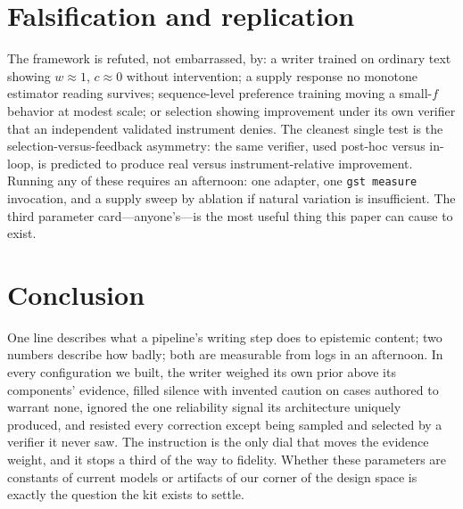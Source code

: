 \documentclass[11pt]{article}
\newcommand{\ww}{\ensuremath{w}}
\newcommand{\cc}{\ensuremath{c}}
\begin{document}
\section{Falsification and replication}
\label{sec:falsify}

The framework is refuted, not embarrassed, by: a writer trained on ordinary
text showing $\ww\approx1$, $\cc\approx0$ without intervention; a supply
response no monotone estimator reading survives; sequence-level preference
training moving a small-$f$ behavior at modest scale; or selection showing
improvement under its own verifier that an independent validated instrument
denies. The cleanest single test is the selection-versus-feedback
asymmetry: the same verifier, used post-hoc versus in-loop, is predicted to
produce real versus instrument-relative improvement. Running any of these
requires an afternoon: one adapter, one \texttt{gst measure} invocation,
and a supply sweep by ablation if natural variation is insufficient. The
third parameter card---anyone's---is the most useful thing this paper can
cause to exist.

\section{Conclusion}
\label{sec:conclusion}

One line describes what a pipeline's writing step does to epistemic
content; two numbers describe how badly; both are measurable from logs in
an afternoon. In every configuration we built, the writer weighed its own
prior above its components' evidence, filled silence with invented caution
on cases authored to warrant none, ignored the one reliability signal its
architecture uniquely produced, and resisted every correction except being
sampled and selected by a verifier it never saw. The instruction is the
only dial that moves the evidence weight, and it stops a third of the way
to fidelity. Whether these parameters are constants of current models or
artifacts of our corner of the design space is exactly the question the
kit exists to settle.
\end{document}
